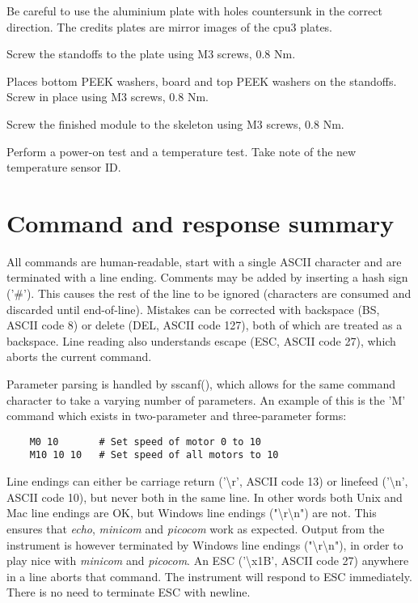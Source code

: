 \documentclass{article}
\begin{document}
Be careful to use the aluminium plate with holes countersunk in the correct direction.
The credits plates are mirror images of the cpu3 plates.

Screw the standoffs to the plate using M3 screws, 0.8 Nm.

Places bottom PEEK washers, board and top PEEK washers on the standoffs.
Screw in place using M3 screws, 0.8 Nm.

Screw the finished module to the skeleton using M3 screws, 0.8 Nm.

Perform a power-on test and a temperature test.
Take note of the new temperature sensor ID.

\newpage
\section{Command and response summary}

All commands are human-readable, start with a single ASCII character and are terminated with a line ending.
Comments may be added by inserting a hash sign ('\#').
This causes the rest of the line to be ignored (characters are consumed and discarded until end-of-line).
Mistakes can be corrected with backspace (BS, ASCII code 8) or delete (DEL, ASCII code 127), both of which are treated as a backspace.
Line reading also understands escape (ESC, ASCII code 27), which aborts the current command.

Parameter parsing is handled by sscanf(), which allows for the same command character to take a varying number
of parameters. An example of this is the 'M' command which exists in two-parameter and three-parameter forms:

\begin{lstlisting}
    M0 10       # Set speed of motor 0 to 10
    M10 10 10   # Set speed of all motors to 10
\end{lstlisting}


Line endings can either be carriage return ('{\textbackslash}r', ASCII code 13) or linefeed ('{\textbackslash}n', ASCII code 10), but never both in the same line.
In other words both Unix and Mac line endings are OK, but Windows line endings ("{\textbackslash}r{\textbackslash}n") are not.
This ensures that {\it echo}, {\it minicom} and {\it picocom} work as expected.
Output from the instrument is however terminated by Windows line endings ("{\textbackslash}r{\textbackslash}n"), in order to play nice with {\it minicom} and {\it picocom}.
An ESC ('{\textbackslash}x1B', ASCII code 27) anywhere in a line aborts that command.
The instrument will respond to ESC immediately.
There is no need to terminate ESC with newline.
\end{document}
